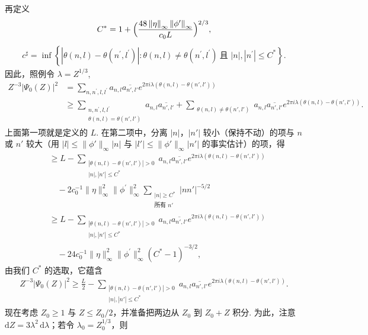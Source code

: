 再定义
\begin{align*}
  C^{*}=1+\Bigl(\frac{48\left\lVert{\eta}\right\rVert_{\infty}\left\lVert{\phi^{\prime}}\right\rVert_{\infty}}{c_{0}L}\Bigr)^{2/3},
\end{align*}
\begin{align*}
  c^{\sharp}=\inf\left\{|\theta(n,l)-\theta(n^{\prime},l^{\prime})|:
  \theta(n,l)\neq\theta(n^{\prime},l^{\prime})\ \text{且 } |n|,|n^{\prime}|\leq C^{*}\right\}.
\end{align*}
因此，照例令 $\lambda = Z^{1/3}$,
\begin{align*}
  Z^{-3}\left|\Psi_{0}(Z)\right|^{2}
  &=\sum_{n,n^{\prime},l,l^{\prime}}a_{n,l}\overline{a_{n',l'}}e^{2\pi i\lambda(\theta(n,l)-\theta(n',l'))}\\
  &\geq\sum_{\substack{n,n^{\prime},l,l^{\prime}\\ \theta(n,l)=\theta(n',l')}}a_{n,l}\overline{a_{n',l'}}
   +\sum_{\substack{\theta(n,l)\neq\theta(n',l')}}a_{n,l}\overline{a_{n',l'}}
   e^{2\pi i\lambda(\theta(n,l)-\theta(n',l'))}.
\end{align*}
上面第一项就是定义的 $L$. 在第二项中，分离 $|n|$，$|n'|$ 较小（保持不动）的项与 $n$ 或 $n'$ 较大（用 $|l| \leq \|\phi'\|_\infty|n|$ 与 $|l'| \leq \|\phi'\|_\infty|n'|$ 的事实估计）的项，得
\begin{align*}
  &\geq L-\sum_{\substack{|\theta(n,l)-\theta(n',l')|>0\\ |n|,|n'|\leq C^{*}}}a_{n,l}\overline{a_{n',l'}}
   e^{2\pi i\lambda(\theta(n,l)-\theta(n',l'))}\\
  &\quad-2c_{0}^{-1}\|\eta\|_{\infty}^{2}\|\phi^{\prime}\|_{\infty}^{2}
   \sum_{\substack{|n|\geq C^{*}\\ \text{所有 } n'}}|nn'|^{-5/2}\\
  &\geq L-\sum_{\substack{|\theta(n,l)-\theta(n',l')|>0\\ |n|,|n'|\leq C^{*}}}a_{n,l}\overline{a_{n',l'}}
   e^{2\pi i\lambda(\theta(n,l)-\theta(n',l'))}\\
  &\quad-24c_{0}^{-1}\|\eta\|_{\infty}^{2}\|\phi^{\prime}\|_{\infty}^{2}(C^{*}-1)^{-3/2},
\end{align*}
由我们 $C^{*}$ 的选取，它蕴含
\begin{align*}
  Z^{-3}\left|\Psi_{0}(Z)\right|^{2}
  \geq\frac{L}{2}-\sum_{\substack{|\theta(n,l)-\theta(n',l')|>0\\ |n|,|n'|\leq C^{*}}}
  a_{n,l}\overline{a_{n',l'}}e^{2\pi i\lambda(\theta(n,l)-\theta(n',l'))}.
\end{align*}
现在考虑 $Z_0 \geq 1$ 与 $Z \leq Z_0/2$，并准备把两边从 $Z_0$ 到 $Z_0 + Z$ 积分. 为此，注意 $\mathrm{d}Z = 3\lambda^2\,\mathrm{d}\lambda$；若令 $\lambda_0 = Z_0^{1/3}$，则
